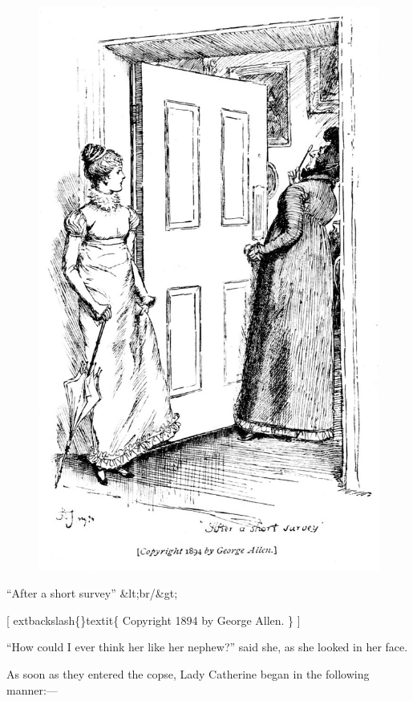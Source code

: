 \documentclass[10pt]{book}
\begin{document}
\begin{figure}[h]
\centering
\includegraphics[width=\linewidth]{images/i_463.jpg}
\end{figure}

     “After a short survey”
     &lt;br/&gt;

     [
     	extbackslash\{\}textit\{
      Copyright 1894 by George Allen.
     \}
     ]
    

   “How could I ever think her like her nephew?” said she, as she looked in
her face.
  

   As soon as they entered the copse, Lady Catherine began in the following
manner:—
  
\end{document}
